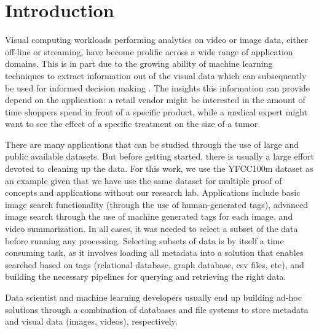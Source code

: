 \section{Introduction}
\label{intro}

Visual computing workloads performing analytics on
video or image data, either off-line or streaming,
have become prolific across a wide range of application domains.
This is in part due to the growing ability of machine learning techniques to
extract information out of the visual data which can subsequently be used
for informed decision making \cite{vdms-nips}.
The insights this information can provide depend on the
application: a retail vendor might be interested in the amount of time
shoppers spend in front of a specific product, while a medical expert might
want to see the effect of a specific treatment on the size of a tumor.

There are many applications that can be studied through the use of large
and public available datasets. But before getting started, there is usually
a large effort devoted to cleaning up the data. For this work, we use
the YFCC100m dataset as an example given that we have use the same dataset
for multiple proof of concepts and applications without our research lab.
Applications include basic image search functionality (through the use
of human-generated tags), advanced image search through the use of
machine generated tags for each image, and video summarization.
In all cases, it was needed to select a subset of the data before running
any processing. Selecting subsets of data is by itself a time consuming task,
as it involves loading all metadata into a solution that enables searched
based on tags (relational database, graph database, csv files, etc), and
building the necessary pipelines for querying and retrieving the right data.

Data scientist and machine learning developers usually end up building ad-hoc
solutions through a combination of databases and file systems to store metadata
and visual data (images, videos), respectively.

